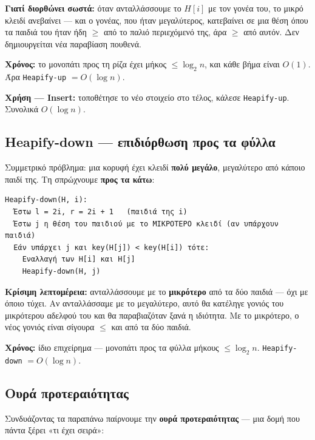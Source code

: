 \documentclass[11pt,a4paper]{article}
\begin{document}
\textbf{Γιατί διορθώνει σωστά:} όταν ανταλλάσσουμε το $H[i]$ με τον γονέα του, το
μικρό κλειδί ανεβαίνει --- και ο γονέας, που ήταν μεγαλύτερος, κατεβαίνει σε μια
θέση όπου τα παιδιά του ήταν ήδη $\ge$ από το παλιό περιεχόμενό της, άρα $\ge$
από αυτόν. Δεν δημιουργείται νέα παραβίαση πουθενά.

\textbf{Χρόνος:} το μονοπάτι προς τη ρίζα έχει μήκος $\le \log_2 n$, και κάθε
βήμα είναι $O(1)$. Άρα \texttt{Heapify-up} $= O(\log n)$.

\textbf{Χρήση --- Insert:} τοποθέτησε το νέο στοιχείο στο τέλος, κάλεσε
\texttt{Heapify-up}. Συνολικά $O(\log n)$.

\subsection{Heapify-down --- επιδιόρθωση προς τα φύλλα}

Συμμετρικό πρόβλημα: μια κορυφή έχει κλειδί \textbf{πολύ μεγάλο}, μεγαλύτερο από
κάποιο παιδί της. Τη σπρώχνουμε \textbf{προς τα κάτω}:

\begin{codebox}
\begin{verbatim}
Heapify-down(H, i):
  Έστω l = 2i, r = 2i + 1   (παιδιά της i)
  Έστω j η θέση του παιδιού με το ΜΙΚΡΟΤΕΡΟ κλειδί (αν υπάρχουν παιδιά)
  Εάν υπάρχει j και key(H[j]) < key(H[i]) τότε:
    Εναλλαγή των H[i] και H[j]
    Heapify-down(H, j)
\end{verbatim}
\end{codebox}

\begin{warningbox}
\textbf{Κρίσιμη λεπτομέρεια:} ανταλλάσσουμε με το \textbf{μικρότερο} από τα δύο
παιδιά --- όχι με όποιο τύχει. Αν ανταλλάσσαμε με το μεγαλύτερο, αυτό θα
κατέληγε γονιός του μικρότερου αδελφού του και θα παραβιαζόταν ξανά η ιδιότητα.
Με το μικρότερο, ο νέος γονιός είναι σίγουρα $\le$ και από τα δύο παιδιά.
\end{warningbox}

\textbf{Χρόνος:} ίδιο επιχείρημα --- μονοπάτι προς τα φύλλα μήκους
$\le \log_2 n$. \texttt{Heapify-down} $= O(\log n)$.

\subsection{Ουρά προτεραιότητας}

Συνδυάζοντας τα παραπάνω παίρνουμε την \textbf{ουρά προτεραιότητας} --- μια δομή
που πάντα ξέρει «τι έχει σειρά»:
\end{document}
